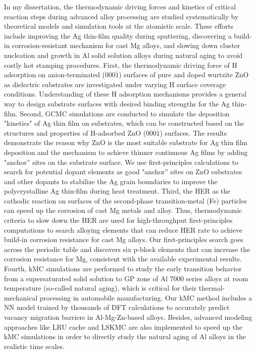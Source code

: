 
In my dissertation, the thermodynamic driving forces and kinetics of critical reaction steps during advanced alloy processing are studied systematically by theoretical models and simulation tools at the atomistic scale. These efforts include improving the Ag thin-film quality during sputtering, discovering a build-in corrosion-resistant mechanism for cast Mg alloys, and slowing down cluster nucleation and growth in Al solid solution alloys during natural aging to avoid costly hot stamping procedures. First, the thermodynamic driving force of H adsorption on anion-terminated (000$\overline{1}$) surfaces of pure and doped wurtzite ZnO as dielectric substrates are investigated under varying H surface coverage conditions. Understanding of these H adsorption mechanisms provides a general way to design substrate surfaces with desired binding strengths for the Ag thin-film. Second, \acf{GCMC} simulations are conducted to simulate the deposition "kinetics" of Ag thin film on substrates, which can be constructed based on the structures and properties of H-adsorbed ZnO (000$\overline{1}$) surfaces. The results demonstrate the reason why ZnO is the most suitable substrate for Ag thin film deposition and the mechanism to achieve thinner continuous Ag films by adding "anchor'' sites on the substrate surface. We use first-principles calculations to search for potential dopant elements as good "anchor'' sites on ZnO substrates and other dopants to stabilize the Ag grain boundaries to improve the polycrystalline Ag thin-film during heat treatment. Third, the \acf{HER} as the cathodic reaction on surfaces of the second-phase transition-metal (Fe) particles can speed up the corrosion of cast Mg metals and alloy. Thus, thermodynamic criteria to slow down the HER are used for high-throughput first-principles computations to search alloying elements that can reduce HER rate to achieve build-in corrosion resistance for cast Mg alloys. Our first-principles search goes across the periodic table and discovers six p-block elements that can increase the corrosion resistance for Mg, consistent with the available experimental results. Fourth, \acf{kMC} simulations are performed to study the early transition behavior from a supersaturated solid solution to \acf{GP} zone of Al 7000 series alloys at room temperature (so-called natural aging), which is critical for their thermal-mechanical processing in automobile manufacturing. Our \ac{kMC} method includes a \acf{NN} model trained by thousands of \ac{DFT} calculations to accurately predict vacancy migration barriers in Al-Mg-Zn-based alloys. Besides, advanced modeling approaches like \acf{LRU} cache and \acf{LSKMC} are also implemented to speed up the \ac{kMC} simulations in order to directly study the natural aging of Al alloys in the realistic time scales.
